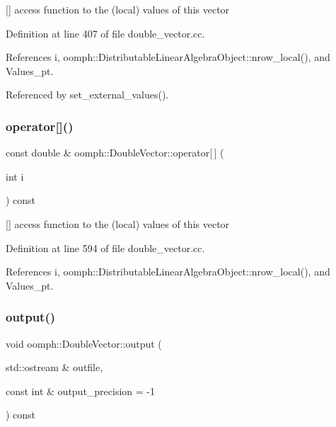 \mbox{[}\mbox{]} access function to the (local) values of this vector 



Definition at line 407 of file double\+\_\+vector.\+cc.



References i, oomph\+::\+Distributable\+Linear\+Algebra\+Object\+::nrow\+\_\+local(), and Values\+\_\+pt.



Referenced by set\+\_\+external\+\_\+values().

\mbox{\label{classoomph_1_1DoubleVector_a54cec3cc3e28f6781c28c0dbcfcffa3e}} 
\subsubsection{\texorpdfstring{operator[]()}{operator[]()}\hspace{0.1cm}{\footnotesize\ttfamily [2/2]}}
{\footnotesize\ttfamily const double \& oomph\+::\+Double\+Vector\+::operator\mbox{[}$\,$\mbox{]} (\begin{DoxyParamCaption}\item[{int}]{i }\end{DoxyParamCaption}) const}



\mbox{[}\mbox{]} access function to the (local) values of this vector 



Definition at line 594 of file double\+\_\+vector.\+cc.



References i, oomph\+::\+Distributable\+Linear\+Algebra\+Object\+::nrow\+\_\+local(), and Values\+\_\+pt.

\mbox{\label{classoomph_1_1DoubleVector_aa258eab026007d7f02847b6e5ef3d1dc}} 
\subsubsection{\texorpdfstring{output()}{output()}\hspace{0.1cm}{\footnotesize\ttfamily [1/2]}}
{\footnotesize\ttfamily void oomph\+::\+Double\+Vector\+::output (\begin{DoxyParamCaption}\item[{std\+::ostream \&}]{outfile,  }\item[{const int \&}]{output\+\_\+precision = {\ttfamily -\/1} }\end{DoxyParamCaption}) const}



